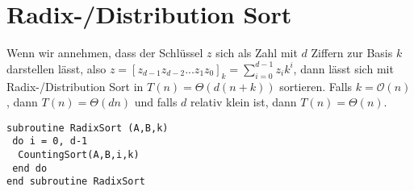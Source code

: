 \section{Radix-/Distribution Sort}

Wenn wir annehmen, dass der Schlüssel $z$ sich als Zahl mit $d$ Ziffern zur Basis $k$ darstellen lässt, also $z=[z_{d-1}z_{d-2}...z_1z_0]_k=\sum_{i=0}^{d-1}z_ik^i$, dann lässt sich mit Radix-/Distribution Sort in $T(n)=\Theta(d(n+k))$ sortieren. Falls $k=\mathcal{O}(n)$, dann $T(n)=\Theta(dn)$ und falls $d$ relativ klein ist, dann $T(n)=\Theta(n)$.

\begin{lstlisting}
subroutine RadixSort (A,B,k)
 do i = 0, d-1
  CountingSort(A,B,i,k)
 end do
end subroutine RadixSort
\end{lstlisting}